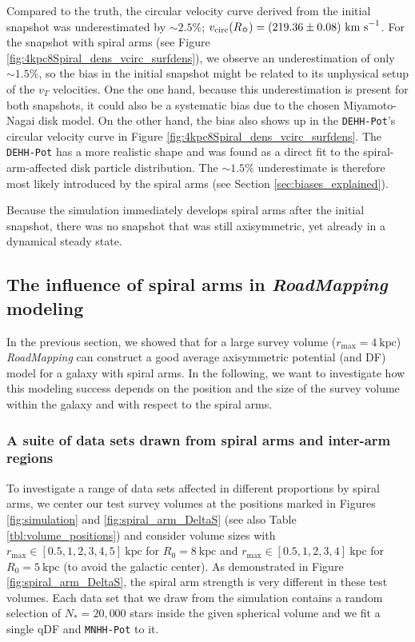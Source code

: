 \documentclass[iop,revtex4,numberedappendix,appendixfloats]{emulateapj}
\newcommand{\RM}{{\sl RoadMapping}}
\begin{document}
Compared to the truth, the circular velocity curve derived from the initial snapshot was underestimated by $\sim2.5\%$; $v_\text{circ}(R_\text{\sun})=(219.36 \pm 0.08) ~\text{km s}^{-1}$. For the snapshot with spiral arms (see Figure \ref{fig:4kpc8Spiral_dens_vcirc_surfdens}), we observe an underestimation of only $\sim1.5\%$, so the bias in the initial snapshot might be related to its unphysical setup of the $v_T$ velocities. One the one hand, because this underestimation is present for both snapshots, it could also be a systematic bias due to the chosen Miyamoto-Nagai disk model. On the other hand, the bias also shows up in the \texttt{DEHH-Pot}'s circular velocity curve in Figure \ref{fig:4kpc8Spiral_dens_vcirc_surfdens}. The \texttt{DEHH-Pot} has a more realistic shape and was found as a direct fit to the spiral-arm-affected disk particle distribution. The $\sim1.5\%$ underestimate is therefore most likely introduced by the spiral arms (see Section \ref{sec:biases_explained}).

Because the simulation immediately develops spiral arms after the initial snapshot, there was no snapshot that was still axisymmetric, yet already in a dynamical steady state.

\subsection{The influence of spiral arms in \RM{} modeling} \label{sec:results_part2}

In the previous section, we showed that for a large survey volume ($r_\text{max}=4~\text{kpc}$) \RM{} can construct a good average axisymmetric potential (and DF) model for a galaxy with spiral arms. In the following, we want to investigate how this modeling success depends on the position and the size of the survey volume within the galaxy and with respect to the spiral arms.


\subsubsection{A suite of data sets drawn from spiral arms and inter-arm regions} \label{sec:suite}

To investigate a range of data sets affected in different proportions by spiral arms, we center our test survey volumes at the positions marked in Figures \ref{fig:simulation} and \ref{fig:spiral_arm_DeltaS} (see also Table \ref{tbl:volume_positions}) and consider volume sizes with $r_\text{max} \in [0.5,1,2,3,4,5]~\text{kpc}$ for $R_0 = 8~\text{kpc}$ and $r_\text{max} \in [0.5,1,2,3,4]~\text{kpc}$ for $R_0 = 5~\text{kpc}$ (to avoid the galactic center). As demonstrated in Figure \ref{fig:spiral_arm_DeltaS}, the spiral arm strength is very different in these test volumes. Each data set that we draw from the simulation contains a random selection of $N_*=20,000$ stars inside the given spherical volume and we fit a single qDF and \texttt{MNHH-Pot} to it. 
\end{document}
